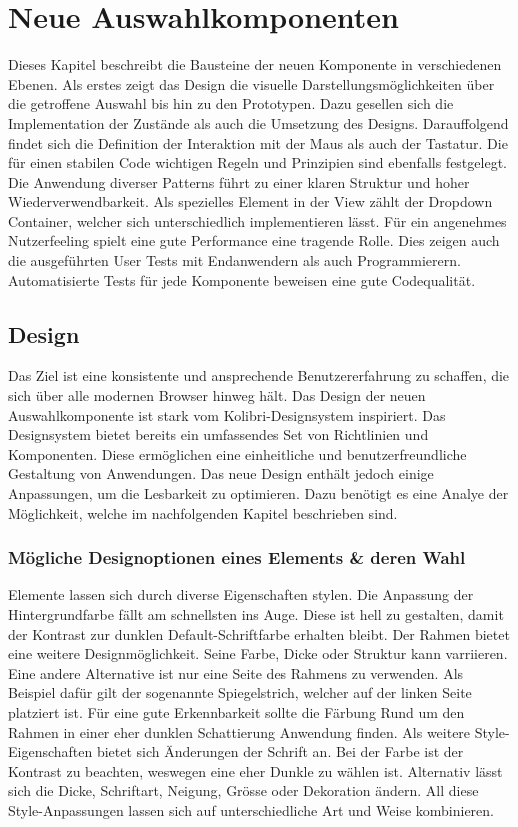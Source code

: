 \chapter{Neue Auswahlkomponenten}
\label{chap:newComponent}

Dieses Kapitel beschreibt die Bausteine der neuen Komponente in verschiedenen Ebenen. 
Als erstes zeigt das Design die visuelle Darstellungsmöglichkeiten über die getroffene Auswahl bis hin zu den Prototypen. 
Dazu gesellen sich die Implementation der Zustände als auch die Umsetzung des Designs.
Darauffolgend findet sich die Definition der Interaktion mit der Maus als auch der Tastatur. 
Die für einen stabilen Code wichtigen Regeln und Prinzipien sind ebenfalls festgelegt. 
Die Anwendung diverser Patterns führt zu einer klaren Struktur und hoher Wiederverwendbarkeit. 
Als spezielles Element in der View zählt der Dropdown Container, welcher sich unterschiedlich implementieren lässt. 
Für ein angenehmes Nutzerfeeling spielt eine gute Performance eine tragende Rolle. 
Dies zeigen auch die ausgeführten User Tests mit Endanwendern als auch Programmierern. 
Automatisierte Tests für jede Komponente beweisen eine gute Codequalität. 


\section{Design}
\label{sec:design}

Das Ziel ist eine konsistente und ansprechende Benutzererfahrung zu schaffen, die sich über alle modernen Browser hinweg hält. 
Das Design der neuen Auswahlkomponente ist stark vom Kolibri-Designsystem inspiriert. 
Das Designsystem bietet bereits ein umfassendes Set von Richtlinien und Komponenten. 
Diese ermöglichen eine einheitliche und benutzerfreundliche Gestaltung von Anwendungen. 
Das neue Design enthält jedoch einige Anpassungen, um die Lesbarkeit zu optimieren. 
Dazu benötigt es eine Analye der Möglichkeit, welche im nachfolgenden Kapitel beschrieben sind. 


\subsection{Mögliche Designoptionen eines Elements \& deren Wahl}
\label{sec:possibleDesignOptions}

Elemente lassen sich durch diverse Eigenschaften stylen. 
Die Anpassung der Hintergrundfarbe fällt am schnellsten ins Auge. 
Diese ist hell zu gestalten, damit der Kontrast zur dunklen Default-Schriftfarbe erhalten bleibt. 
Der Rahmen bietet eine weitere Designmöglichkeit. 
Seine Farbe, Dicke oder Struktur kann varriieren. 
Eine andere Alternative ist nur eine Seite des Rahmens zu verwenden. 
Als Beispiel dafür gilt der sogenannte Spiegelstrich, welcher auf der linken Seite platziert ist. 
Für eine gute Erkennbarkeit sollte die Färbung Rund um den Rahmen in einer eher dunklen Schattierung Anwendung finden. 
Als weitere Style-Eigenschaften bietet sich Änderungen der Schrift an. 
Bei der Farbe ist der Kontrast zu beachten, weswegen eine eher Dunkle zu wählen ist. 
Alternativ lässt sich die Dicke, Schriftart, Neigung, Grösse oder Dekoration ändern. 
All diese Style-Anpassungen lassen sich auf unterschiedliche Art und Weise kombinieren. 

